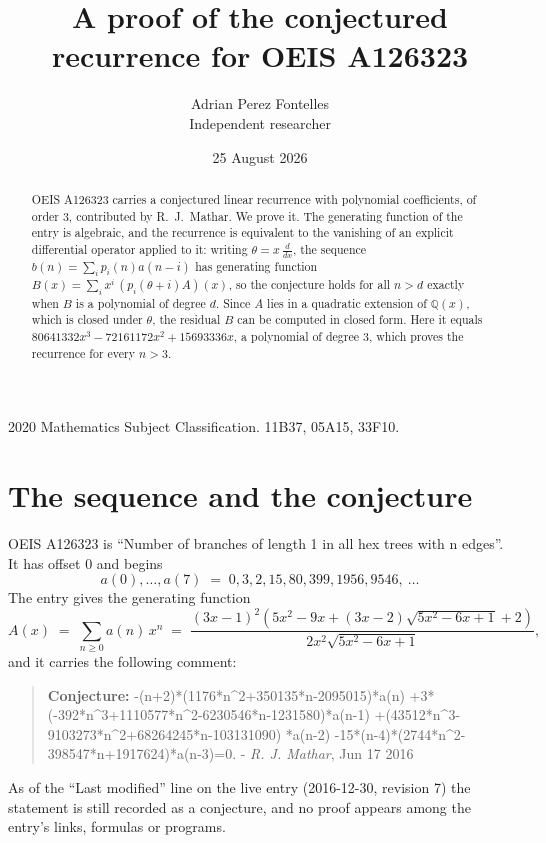 \documentclass[11pt,a4paper]{article}
\title{A proof of the conjectured recurrence for OEIS A126323}
\author{Adrian Perez Fontelles\\ \small Independent researcher}
\date{25 August 2026}
\theoremstyle{plain}
\theoremstyle{definition}
\begin{document}
\maketitle

\begin{abstract}
OEIS A126323 carries a conjectured linear recurrence with polynomial coefficients, of
order 3, contributed by R.~J.~Mathar. We prove it. The generating function of the
entry is algebraic, and the recurrence is equivalent to the vanishing of an explicit
differential operator applied to it: writing $\theta=x\,\frac{d}{dx}$, the sequence
$b(n)=\sum_{i}p_{i}(n)a(n-i)$ has generating function
$B(x)=\sum_{i}x^{i}\,(p_{i}(\theta+i)A)(x)$, so the conjecture holds for all $n>d$ exactly
when $B$ is a polynomial of degree $d$. Since $A$ lies in a quadratic extension of
$\mathbb{Q}(x)$, which is closed under $\theta$, the residual $B$ can be computed in
closed form. Here it equals $80641332 x^{3} - 72161172 x^{2} + 15693336 x$, a polynomial of degree $3$, which proves
the recurrence for every $n>3$.
\end{abstract}

\noindent\small 2020 Mathematics Subject Classification. 11B37, 05A15, 33F10.\normalsize

\section{The sequence and the conjecture}

OEIS A126323 is ``Number of branches of length 1 in all hex trees with n edges''. It has offset $0$ and begins
\[
a(0),\dots,a(7)\;=\;0, 3, 2, 15, 80, 399, 1956, 9546,\ \dots
\]
The entry gives the generating function
\begin{equation}\label{eq:gf}
A(x)\;=\;\sum_{n\ge 0} a(n)\,x^{n}\;=\;\frac{\left(3 x - 1\right)^{2} \left(5 x^{2} - 9 x + \left(3 x - 2\right) \sqrt{5 x^{2} - 6 x + 1} + 2\right)}{2 x^{2} \sqrt{5 x^{2} - 6 x + 1}} ,
\end{equation}
and it carries the following comment:
\begin{quote}\small
\textbf{Conjecture:} -(n+2)*(1176*n\^{}2+350135*n-2095015)*a(n) +3*(-392*n\^{}3+1110577*n\^{}2-6230546*n-1231580)*a(n-1) +(43512*n\^{}3-9103273*n\^{}2+68264245*n-103131090) *a(n-2) -15*(n-4)*(2744*n\^{}2-398547*n+1917624)*a(n-3)=0. - \emph{R. J. Mathar}, Jun 17 2016
\end{quote}
As of the ``Last modified'' line on the live entry (2016-12-30, revision 7) the
statement is still recorded as a conjecture, and no proof appears among the entry's links,
formulas or programs.
\end{document}
